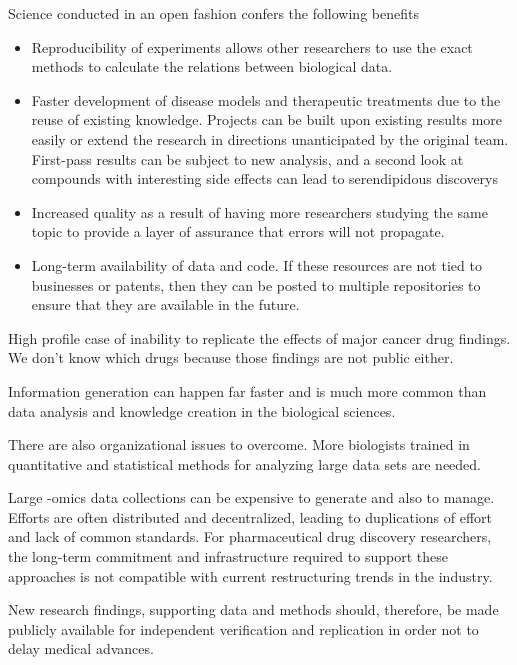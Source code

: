 Science conducted in an open fashion confers the following benefits

\begin{itemize}

\item Reproducibility of experiments allows other researchers to use the exact methods to calculate the relations between biological data.

\item Faster development of disease models and therapeutic treatments due to the reuse of existing knowledge. Projects can be built upon existing results more easily or extend the research in directions unanticipated by the original team. First-pass results can be subject to new analysis, and a second look at compounds with interesting side effects can lead to serendipidous discoverys

\item Increased quality as a result of having more researchers studying the same topic to provide a layer of assurance that errors will not propagate.

\item Long-term availability of data and code. If these resources are not tied to businesses or patents, then they can be posted to multiple repositories to ensure that they are available in the future.
\cite{Prlic2012}

\end{itemize}

High profile case of inability to replicate the effects of major cancer drug findings. \cite{} We don't know which drugs because those findings are not public either.

Information generation can happen far faster and is much more common than data analysis and knowledge creation in the biological sciences.

There are also organizational issues to overcome. More biologists trained in quantitative and statistical methods for analyzing large data sets are needed. 

Large -omics data collections can be expensive to generate and also to manage. Efforts are often distributed and decentralized, leading to duplications of effort and lack of common standards. For pharmaceutical drug discovery researchers, the long-term commitment and infrastructure required to support these approaches is not compatible with current restructuring trends in the industry.\cite{Berg2014}

New research findings, supporting data and methods should, therefore, be made publicly available for independent verification and replication in order not to delay medical advances.


